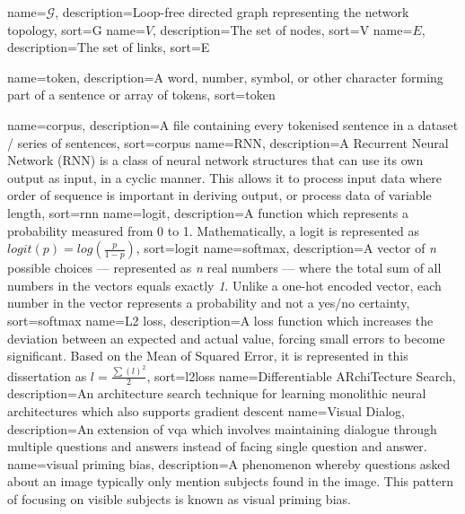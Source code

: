 {
    name=\(\mathcal{G}\),
    description={Loop-free directed graph representing the network topology},
    sort=G
}
{
    name=\(V\),
    description={The set of nodes},
    sort=V
}
{
    name=\(E\),
    description={The set of links},
    sort=E
}

{
    name=token,
    description={A word, number, symbol, or other character forming part of a sentence or array of tokens},
    sort=token
}

{
    name=corpus,
    description={A file containing every tokenised sentence in a dataset / series of sentences},
    sort=corpus
}
{
    name={RNN},
    description={A Recurrent Neural Network (RNN) is a class of neural network structures that
            can use its own output as input, in a cyclic manner. This allows it to process input data where order of sequence is important in deriving output, or process data of variable length},
    sort=rnn
}
{
    name={logit},
    description={A function which represents a probability measured from 0 to 1. Mathematically, a logit is represented as \(logit(p)=log(\frac{p}{1-p})\)},
    sort=logit
}
{
    name={softmax},
    description={A vector of \textit{n} possible choices --- represented as \textit{n} real numbers --- where the total sum of all numbers in the vectors equals exactly \textit{1}. Unlike a one-hot encoded vector, each number in the vector represents a probability and not a yes/no certainty},
    sort=softmax
}
{
    name={L2 loss},
    description={A loss function which increases the deviation between an expected and actual value, forcing small errors to become significant. Based on the Mean of Squared Error, it is represented in this dissertation as \(l=\frac{\sum(l)^2}{2}\)},
    sort=l2loss
}
{
    name={Differentiable ARchiTecture Search},
    description={An architecture search technique for learning monolithic neural architectures which also supports gradient descent}
}
{
    name={Visual Dialog},
    description={An extension of \gls{vqa} which involves maintaining dialogue through multiple questions and answers instead of facing single question and answer. }
}
{
    name={visual priming bias},
    description={A phenomenon whereby questions asked about an image typically only mention subjects found in the image. This pattern of focusing on visible subjects is known as visual priming bias.}
}
